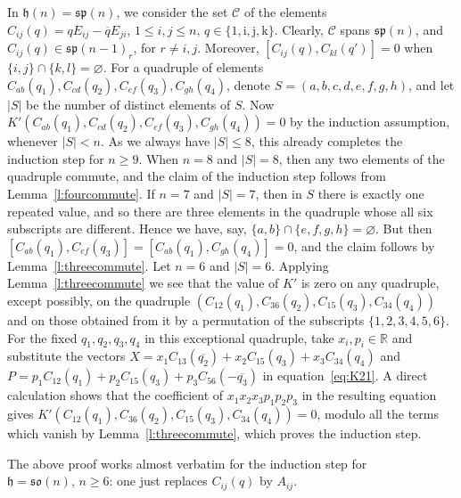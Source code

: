 \documentclass[10pt,a4paper]{amsart}
\newcommand \br{\mathbb{R}}
\newcommand \cC{\mathcal{C}}
\newcommand\h{\mathfrak h}
\newcommand \so{\mathfrak{so}}
\newcommand \spg{\mathfrak{sp}}
\newcommand \ir{\mathrm{i}}
\newcommand \jr{\mathrm{j}}
\newcommand \kr{\mathrm{k}}
\newcommand \<{\langle}
\renewcommand \>{\rangle}
\begin{document}
	In $\h(n)=\spg(n)$, we consider the set $\cC$ of the elements $C_{ij}(q) = q E_{ij} - \overline{q} E_{ji}, \, 1 \le i,j \le n, \, q \in \{1,\ir,\jr,\kr\}$. Clearly, $\cC$ spans $\spg(n)$, and $C_{ij}(q) \in \spg(n-1)_r$, for $r \ne i,j$. Moreover, $[C_{ij}(q), C_{kl}(q')] = 0$ when $\{i,j\} \cap \{k,l\} = \varnothing$. For a quadruple of elements $C_{ab}(q_1), C_{cd}(q_2), C_{ef}(q_3), C_{gh}(q_4)$, denote $S = (a,b,c,d,e,f,g,h)$, and let $|S|$ be the number of distinct elements of $S$. Now $K'(C_{ab}(q_1), C_{cd}(q_2), C_{ef}(q_3), C_{gh}(q_4)) = 0$ by the induction assumption, whenever $|S| < n$. As we always have $|S| \le 8$, this already completes the induction step for $n \ge 9$. When $n = 8$ and $|S| = 8$, then any two elements of the quadruple commute, and the claim of the induction step follows from Lemma~\ref{l:fourcommute}. If $n = 7$ and $|S| = 7$, then in $S$ there is exactly one repeated value, and so there are three elements in the quadruple whose all six subscripts are different. Hence we have, say, $\{a,b\} \cap \{e,f,g,h\} = \varnothing$. But then $[C_{ab}(q_1), C_{ef}(q_3)] = [C_{ab}(q_1), C_{gh}(q_4)] = 0$, and the claim follows by Lemma~\ref{l:threecommute}. Let $n = 6$ and $|S|=6$. Applying Lemma~\ref{l:threecommute} we see that the value of $K'$ is zero on any quadruple, except possibly, on the quadruple $(C_{12}(q_1),C_{36}(q_2),C_{15}(q_3),C_{34}(q_4))$ and on those obtained from it by a permutation of the subscripts $\{1,2,3,4,5,6\}$. For the fixed $q_1,q_2,q_3,q_4$ in this exceptional quadruple, take $x_i,p_i \in \br$ and substitute the vectors $X=x_1 C_{13}(\overline{q_2})+x_2 C_{15}(q_3)+x_3 C_{34}(q_4)$ and $P = p_1 C_{12}(q_1) + p_2 C_{15}(q_3) + p_3 C_{56}(-\overline{q_3})$ in equation~\eqref{eq:K21}. A direct calculation shows that the coefficient of $x_1x_2x_3p_1p_2p_3$ in the resulting equation gives $K'(C_{12}(q_1),C_{36}(q_2),C_{15}(q_3),C_{34}(q_4))=0$, modulo all the terms which vanish by Lemma~\ref{l:threecommute}, which proves the induction step.
	
	The above proof works almost verbatim for the induction step for $\h=\so(n), \, n \ge 6$: one just replaces $C_{ij}(q)$ by $A_{ij}$.
	
\end{document}
